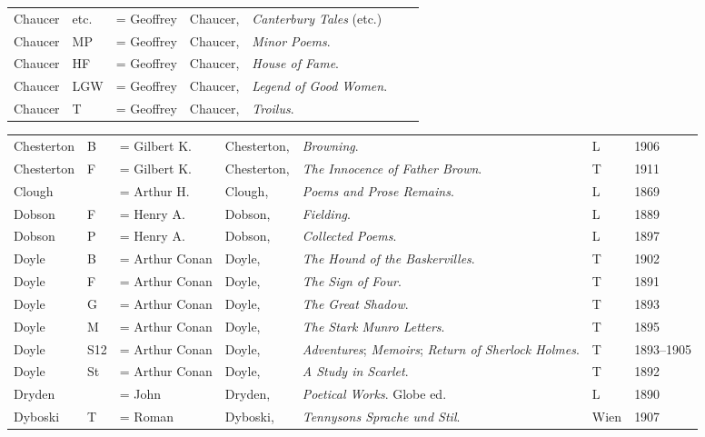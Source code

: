 \begin{sidewaystable}
\begin{tabular}{p{} p{} p{} p{} p{} p{} p{}}
Chaucer & etc. & = Geoffrey & Chaucer, & \textit{Canterbury Tales} (etc.) & & \\
Chaucer & MP & = Geoffrey & Chaucer, & \textit{Minor Poems}. & & \\
Chaucer & HF & = Geoffrey & Chaucer, & \textit{House of Fame}. & & \\
Chaucer & LGW & = Geoffrey & Chaucer, & \textit{Legend of Good Women}. & & \\
Chaucer & T & = Geoffrey & Chaucer, & \textit{Troilus}. & & \\
\end{tabular}
\end{sidewaystable}


\begin{sidewaystable}
\centering\small
\begin{tabular}{p{} p{} p{} p{} p{} p{} p{}}
Chesterton & B & = Gilbert K. & Chesterton, & \textit{Browning}. & L & 1906 \\
Chesterton & F & = Gilbert K. & Chesterton, & \textit{The Innocence of Father Brown}. & T & 1911 \\
Clough & & = Arthur H. & Clough, & \textit{Poems and Prose Remains}. & L & 1869 \\
Dobson & F & = Henry A. & Dobson, & \textit{Fielding}. & L & 1889 \\
Dobson & P & = Henry A. & Dobson, & \textit{Collected Poems}. & L & 1897 \\
Doyle & B & = Arthur Conan & Doyle, & \textit{The Hound of the Baskervilles}. & T & 1902 \\
Doyle & F & = Arthur Conan & Doyle, & \textit{The Sign of Four}. & T & 1891 \\
Doyle & G & = Arthur Conan & Doyle, & \textit{The Great Shadow}. & T & 1893 \\
Doyle & M & = Arthur Conan & Doyle, & \textit{The Stark Munro Letters}. & T & 1895 \\
Doyle & S12 & = Arthur Conan & Doyle, & \textit{Adventures}; \textit{Memoirs}; \textit{Return of Sherlock Holmes}. & T & 1893--1905 \\
Doyle & St & = Arthur Conan & Doyle, & \textit{A Study in Scarlet}. & T & 1892 \\
Dryden & & = John & Dryden, & \textit{Poetical Works}. Globe ed. & L & 1890 \\
Dyboski & T & = Roman & Dyboski, & \textit{Tennysons Sprache und Stil}. & Wien & 1907 \\

\end{tabular}
\end{sidewaystable}
